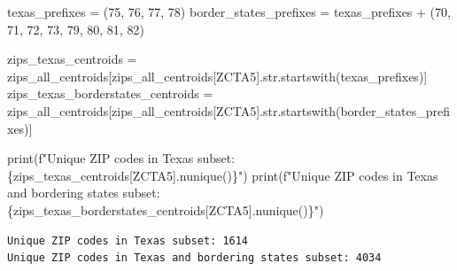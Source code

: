 \documentclass[
  letterpaper,
  DIV=11,
  numbers=noendperiod]{scrartcl}
\newenvironment{Shaded}{\begin{snugshade}}{\end{snugshade}}
\newcommand{\BuiltInTok}[1]{\textcolor[rgb]{0.00,0.23,0.31}{#1}}
\newcommand{\NormalTok}[1]{\textcolor[rgb]{0.00,0.23,0.31}{#1}}
\newcommand{\OperatorTok}[1]{\textcolor[rgb]{0.37,0.37,0.37}{#1}}
\newcommand{\SpecialCharTok}[1]{\textcolor[rgb]{0.37,0.37,0.37}{#1}}
\newcommand{\SpecialStringTok}[1]{\textcolor[rgb]{0.13,0.47,0.30}{#1}}
\newcommand{\StringTok}[1]{\textcolor[rgb]{0.13,0.47,0.30}{#1}}
\begin{document}
\begin{Shaded}
\begin{Highlighting}[]
\NormalTok{texas\_prefixes }\OperatorTok{=}\NormalTok{ (}\StringTok{\textquotesingle{}75\textquotesingle{}}\NormalTok{, }\StringTok{\textquotesingle{}76\textquotesingle{}}\NormalTok{, }\StringTok{\textquotesingle{}77\textquotesingle{}}\NormalTok{, }\StringTok{\textquotesingle{}78\textquotesingle{}}\NormalTok{)}
\NormalTok{border\_states\_prefixes }\OperatorTok{=}\NormalTok{ texas\_prefixes }\OperatorTok{+}\NormalTok{ (}\StringTok{\textquotesingle{}70\textquotesingle{}}\NormalTok{, }\StringTok{\textquotesingle{}71\textquotesingle{}}\NormalTok{, }\StringTok{\textquotesingle{}72\textquotesingle{}}\NormalTok{, }\StringTok{\textquotesingle{}73\textquotesingle{}}\NormalTok{, }\StringTok{\textquotesingle{}79\textquotesingle{}}\NormalTok{, }\StringTok{\textquotesingle{}80\textquotesingle{}}\NormalTok{, }\StringTok{\textquotesingle{}81\textquotesingle{}}\NormalTok{, }\StringTok{\textquotesingle{}82\textquotesingle{}}\NormalTok{)}

\NormalTok{zips\_texas\_centroids }\OperatorTok{=}\NormalTok{ zips\_all\_centroids[zips\_all\_centroids[}\StringTok{\textquotesingle{}ZCTA5\textquotesingle{}}\NormalTok{].}\BuiltInTok{str}\NormalTok{.startswith(texas\_prefixes)]}
\NormalTok{zips\_texas\_borderstates\_centroids }\OperatorTok{=}\NormalTok{ zips\_all\_centroids[zips\_all\_centroids[}\StringTok{\textquotesingle{}ZCTA5\textquotesingle{}}\NormalTok{].}\BuiltInTok{str}\NormalTok{.startswith(border\_states\_prefixes)]}

\BuiltInTok{print}\NormalTok{(}\SpecialStringTok{f"Unique ZIP codes in Texas subset: }\SpecialCharTok{\{}\NormalTok{zips\_texas\_centroids[}\StringTok{\textquotesingle{}ZCTA5\textquotesingle{}}\NormalTok{]}\SpecialCharTok{.}\NormalTok{nunique()}\SpecialCharTok{\}}\SpecialStringTok{"}\NormalTok{)}
\BuiltInTok{print}\NormalTok{(}\SpecialStringTok{f"Unique ZIP codes in Texas and bordering states subset: }\SpecialCharTok{\{}\NormalTok{zips\_texas\_borderstates\_centroids[}\StringTok{\textquotesingle{}ZCTA5\textquotesingle{}}\NormalTok{]}\SpecialCharTok{.}\NormalTok{nunique()}\SpecialCharTok{\}}\SpecialStringTok{"}\NormalTok{)}
\end{Highlighting}
\end{Shaded}

\begin{verbatim}
Unique ZIP codes in Texas subset: 1614
Unique ZIP codes in Texas and bordering states subset: 4034
\end{verbatim}
\end{document}
